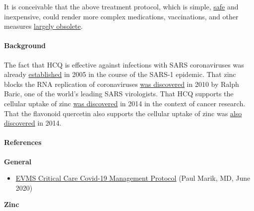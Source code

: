It is conceivable that the above treatment protocol, which is simple,
\href{https://swprs.files.wordpress.com/2020/07/hcq-white-paper-dr-simone-gold.pdf}{safe}
and inexpensive, could render more complex medications, vaccinations,
and other measures
\href{https://www.newsweek.com/key-defeating-covid-19-already-exists-we-need-start-using-it-opinion-1519535}{largely
obsolete}.

\hypertarget{background}{%
\paragraph{Background}\label{background}}

The fact that HCQ is effective against infections with SARS
coronaviruses was already
\href{https://www.ncbi.nlm.nih.gov/pmc/articles/PMC1232869/}{established}
in 2005 in the course of the SARS-1 epidemic. That zinc blocks the RNA
replication of coronaviruses
\href{https://www.ncbi.nlm.nih.gov/pmc/articles/PMC2973827/}{was
discovered} in 2010 by Ralph Baric, one of the world's leading SARS
virologists. That HCQ supports the cellular uptake of zinc
\href{https://journals.plos.org/plosone/article?id=10.1371/journal.pone.0109180}{was
discovered} in 2014 in the context of cancer research. That the
flavonoid quercetin also supports the cellular uptake of zinc was
\href{https://pubs.acs.org/doi/10.1021/jf5014633}{also discovered} in
2014.

\hypertarget{references}{%
\paragraph{References}\label{references}}

\textbf{General}

\begin{itemize}
\tightlist
\item
  \href{https://www.evms.edu/covid-19/covid_care_for_clinicians/}{EVMS
  Critical Care Covid-19 Management Protocol} (Paul Marik, MD, June
  2020)
\end{itemize}

\textbf{Zinc}

